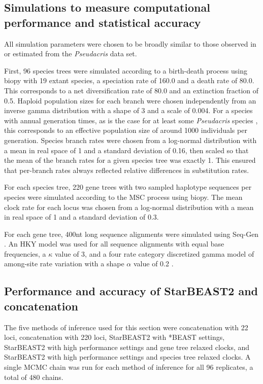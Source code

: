\documentclass[12pt]{article}
\begin{document}
\subsection{Simulations to measure computational performance and statistical accuracy}

All simulation parameters were chosen to be broadly similar to those observed in
or estimated from the \textit{Pseudacris} data set.

First, 96 species trees were simulated according to a birth-death process
\citep{Gernhard2008769} using biopy with 19 extant species, a speciation rate of
160.0 and a death rate of 80.0. This corresponds to a net diversification rate
of 80.0 and an extinction fraction of 0.5. Haploid population sizes
for each branch were chosen independently from an inverse gamma distribution
with a shape of 3 and a scale of 0.004. For a species with annual generation
times, as is the case for at least some \textit{Pseudacris} species
\citep{10.2307/1446044}, this corresponds to an effective population size
of around 1000 individuals per generation. Species branch rates were chosen from a
log-normal distribution with a mean in real space of 1 and a standard
deviation of 0.16, then scaled so that the mean of the branch rates for a given
species tree was exactly 1. This ensured that per-branch rates always reflected
relative differences in substitution rates.

For each species tree, 220 gene trees with two sampled haplotype sequences per
species were simulated according to the MSC process using biopy. The mean clock
rate for each locus was chosen from a log-normal distribution with a mean in
real space of 1 and a standard deviation of 0.3.

For each gene tree, 400nt long sequence alignments were simulated using Seq-Gen
\citep{Rambaut01061997}. An HKY model was used for all sequence alignments with
equal base frequencies, a $\kappa$ value of 3, and a four rate category
discretized gamma model of among-site rate variation with a shape $\alpha$ value
of 0.2 \citep{Yang1994}.

\subsection{Performance and accuracy of StarBEAST2 and concatenation}

The five methods of inference used for this section were concatenation with 22
loci, concatenation with 220 loci, StarBEAST2 with *BEAST settings, StarBEAST2
with high performance settings and gene tree relaxed clocks, and StarBEAST2 with
high performance settings and species tree relaxed clocks. A single MCMC chain was
run for each method of inference for all 96 replicates, a total of 480 chains.
\end{document}
